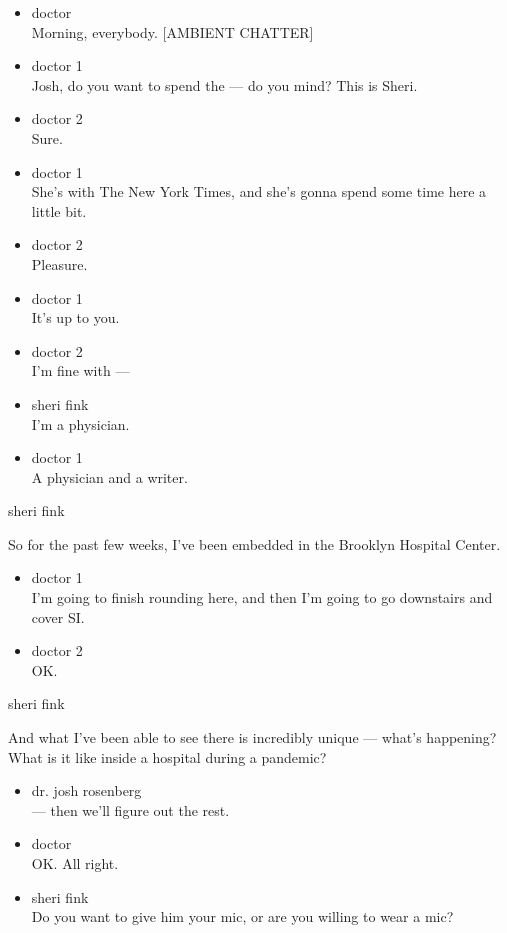 \begin{itemize}
\item
  doctor\\
  Morning, everybody. {[}AMBIENT CHATTER{]}
\item
  doctor 1\\
  Josh, do you want to spend the --- do you mind? This is Sheri.
\item
  doctor 2\\
  Sure.
\item
  doctor 1\\
  She's with The New York Times, and she's gonna spend some time here a
  little bit.
\item
  doctor 2\\
  Pleasure.
\item
  doctor 1\\
  It's up to you.
\item
  doctor 2\\
  I'm fine with ---
\item
  sheri fink\\
  I'm a physician.
\item
  doctor 1\\
  A physician and a writer.
\end{itemize}

sheri fink

So for the past few weeks, I've been embedded in the Brooklyn Hospital
Center.

\begin{itemize}
\item
  doctor 1\\
  I'm going to finish rounding here, and then I'm going to go downstairs
  and cover SI.
\item
  doctor 2\\
  OK.
\end{itemize}

sheri fink

And what I've been able to see there is incredibly unique --- what's
happening? What is it like inside a hospital during a pandemic?

\begin{itemize}
\item
  dr. josh rosenberg\\
  --- then we'll figure out the rest.
\item
  doctor\\
  OK. All right.
\item
  sheri fink\\
  Do you want to give him your mic, or are you willing to wear a mic?
\end{itemize}

